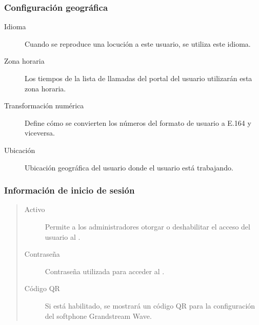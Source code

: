 \documentclass[letterpaper,10pt,spanish]{sphinxmanual}
\begin{document}
\subsubsection{Configuración geográfica}
\label{administration_portal/client/vpbx/users:geographic-configuration}\begin{description}
\item[{Idioma}] \leavevmode{}\label{administration_portal/client/vpbx/users:term-language}
Cuando se reproduce una locución a este usuario, se utiliza este idioma.

\item[{Zona horaria}] \leavevmode{}\label{administration_portal/client/vpbx/users:term-timezone}
Los tiempos de la lista de llamadas del portal del usuario utilizarán esta zona horaria.

\item[{Transformación numérica}] \leavevmode{}\label{administration_portal/client/vpbx/users:term-numeric-transformation}
Define cómo se convierten los números del formato de usuario a E.164 y viceversa.

\item[{Ubicación}] \leavevmode{}\label{administration_portal/client/vpbx/users:term-location}
Ubicación geográfica del usuario donde el usuario está trabajando.

\end{description}


\subsubsection{Información de inicio de sesión}
\label{administration_portal/client/vpbx/users:login-info}\begin{quote}
\begin{description}
\item[{Activo}] \leavevmode
Permite a los administradores otorgar o deshabilitar el acceso del usuario al {\hyperref[user_portal/index:userportal]{}}.

\item[{Contraseña}] \leavevmode
Contraseña utilizada para acceder al {\hyperref[user_portal/index:userportal]{}}.

\item[{Código QR}] \leavevmode
Si está habilitado, se mostrará un código QR para la configuración del softphone Grandstream Wave.

\end{description}
\end{quote}
\end{document}
